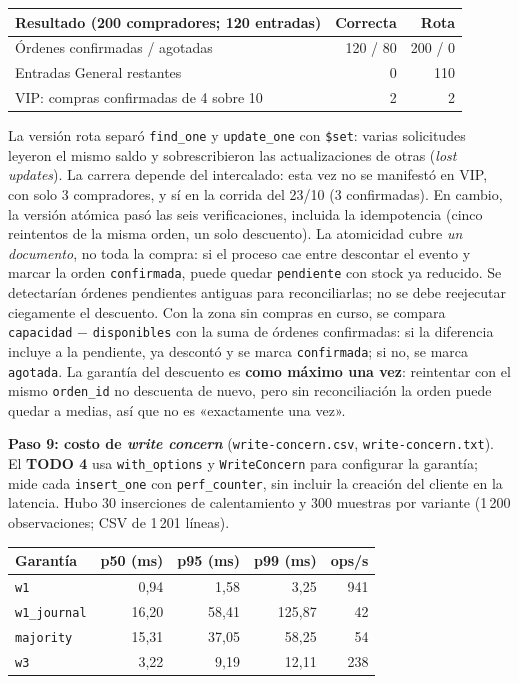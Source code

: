 \documentclass[10pt,letterpaper]{article}
\begin{document}
\begin{center}\footnotesize
\begin{tabular}{@{}lrr@{}}
\toprule
\textbf{Resultado (200 compradores; 120 entradas)} & \textbf{Correcta} & \textbf{Rota} \\
\midrule
Órdenes confirmadas / agotadas & 120 / 80 & 200 / 0 \\
Entradas General restantes & 0 & 110 \\
VIP: compras confirmadas de 4 sobre 10 & 2 & 2 \\
\bottomrule
\end{tabular}
\end{center}

La versión rota separó \texttt{find\_one} y \texttt{update\_one} con
\texttt{\$set}: varias solicitudes leyeron el mismo saldo y sobrescribieron
las actualizaciones de otras (\emph{lost updates}). La carrera depende del
intercalado: esta vez no se manifestó en VIP, con solo 3 compradores, y sí en la
corrida del 23/10 (3 confirmadas). En cambio, la versión
atómica pasó las seis verificaciones, incluida la idempotencia (cinco
reintentos de la misma orden, un solo descuento). La atomicidad cubre
\emph{un documento}, no toda la compra: si el proceso cae entre descontar
el evento y marcar la orden \texttt{confirmada}, puede quedar
\texttt{pendiente} con stock ya reducido. Se detectarían órdenes pendientes
antiguas para reconciliarlas; no se debe reejecutar ciegamente el descuento.
Con la zona sin compras en curso, se compara \texttt{capacidad} $-$
\texttt{disponibles} con la suma de órdenes confirmadas: si la diferencia
incluye a la pendiente, ya descontó y se marca \texttt{confirmada}; si no, se
marca \texttt{agotada}. La garantía del descuento es \textbf{como máximo una
vez}: reintentar con el mismo \texttt{orden\_id} no descuenta de nuevo, pero
sin reconciliación la orden puede quedar a medias, así que no es «exactamente
una vez».

\textbf{Paso 9: costo de \emph{write concern}} (\texttt{write-concern.csv},
\texttt{write-concern.txt}). El \textbf{TODO 4} usa
\texttt{with\_options} y \texttt{WriteConcern} para configurar la garantía; mide cada
\texttt{insert\_one} con \texttt{perf\_counter}, sin incluir la creación
del cliente en la latencia. Hubo 30 inserciones de calentamiento y 300
muestras por variante (1\,200 observaciones; CSV de 1\,201 líneas).

\begin{center}\footnotesize
\begin{tabular}{@{}lrrrr@{}}
\toprule
\textbf{Garantía} & \textbf{p50 (ms)} & \textbf{p95 (ms)} & \textbf{p99 (ms)} & \textbf{ops/s} \\
\midrule
\texttt{w1} & 0,94 & 1,58 & 3,25 & 941 \\
\texttt{w1\_journal} & 16,20 & 58,41 & 125,87 & 42 \\
\texttt{majority} & 15,31 & 37,05 & 58,25 & 54 \\
\texttt{w3} & 3,22 & 9,19 & 12,11 & 238 \\
\bottomrule
\end{tabular}
\end{center}
\end{document}
